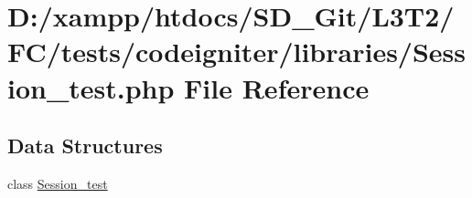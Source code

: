 \hypertarget{tests_2codeigniter_2libraries_2_session__test_8php}{}\section{D\+:/xampp/htdocs/\+S\+D\+\_\+\+Git/\+L3\+T2/\+F\+C/tests/codeigniter/libraries/\+Session\+\_\+test.php File Reference}
\label{tests_2codeigniter_2libraries_2_session__test_8php}
\subsection*{Data Structures}
\begin{DoxyCompactItemize}
\item 
class \hyperlink{class_session__test}{Session\+\_\+test}
\end{DoxyCompactItemize}
